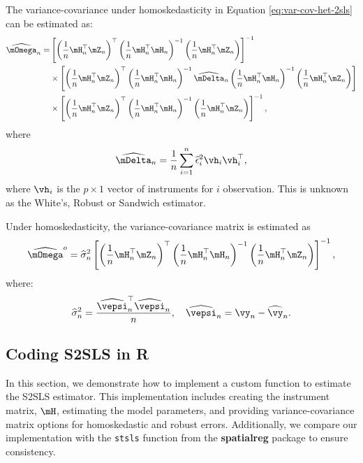 The variance-covariance under homoskedasticity in Equation \eqref{eq:var-cov-het-2sls} can be estimated as:
\begin{equation}\label{eq:v-s2sls-hetero}
\begin{aligned}
\widehat{\mOmega}_n = &  \left[\left(\frac{1}{n}\mH_n^\top\mZ_n\right)^\top\left(\frac{1}{n}\mH_n^\top\mH_n\right)^{-1}\left(\frac{1}{n}\mH_n^\top\mZ_n\right)\right]^{-1} \\
 & \times \left[\left(\frac{1}{n}\mH_n^\top\mZ_n\right)^\top\left(\frac{1}{n}\mH_n^\top\mH_n\right)^{-1}\widehat{\mDelta}_n\left(\frac{1}{n}\mH_n^\top\mH_n\right)^{-1}\left(\frac{1}{n}\mH_n^\top\mZ_n\right)\right] \\
 & \times \left[\left(\frac{1}{n}\mH_n^\top\mZ_n\right)^\top\left(\frac{1}{n}\mH_n^\top\mH_n\right)^{-1}\left(\frac{1}{n}\mH_n^\top\mZ_n\right)\right]^{-1},
\end{aligned}
\end{equation}
%
where 
\begin{equation}\label{eq:2sls-delta-hat}
\widehat{\mDelta}_n = \frac{1}{n}\sum_{i = 1}^n\widehat{\epsilon}_i^2\vh_i\vh_i^\top, 
\end{equation}
%
where $\vh_i$ is the $p\times 1$ vector of instruments for $i$ observation. This is unknown as the White's, Robust or Sandwich estimator. 

Under homoskedasticity, the variance-covariance matrix is estimated as
\begin{equation}\label{eq:v-s2sls-homo}
\widehat{\mOmega}^o = \widehat{\sigma}^2_{n}\left[\left(\frac{1}{n}\mH_n^\top\mZ_n\right)^\top\left(\frac{1}{n}\mH_n^\top\mH_n\right)^{-1}\left(\frac{1}{n}\mH_n^\top\mZ_n\right)\right]^{-1},
\end{equation}
%
where:
\begin{equation}\label{eq:2sls-sigma-hat}
  \widehat{\sigma}^2_n = \frac{\widehat{\vepsi}_n^\top\widehat{\vepsi}_n}{n},\quad \widehat{\vepsi}_n = \vy_n - \widehat{\vy}_n.
\end{equation}

\subsection{Coding S2SLS in R}

In this section, we demonstrate how to implement a custom function to estimate the S2SLS estimator. This implementation includes creating the instrument matrix, $\mH$, estimating the model parameters, and providing variance-covariance matrix options for homoskedastic and robust errors. Additionally, we compare our implementation with the \texttt{stsls} function from the \textbf{spatialreg} package \citep{spatialregcit} to ensure consistency.


